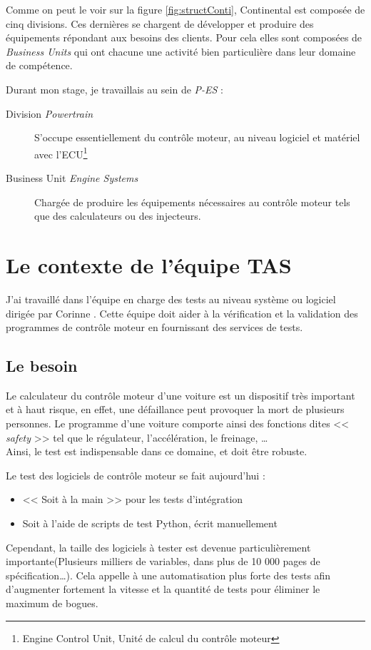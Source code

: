 		Comme on peut le voir sur la figure \ref{fig:structConti}, Continental est composée de cinq divisions. Ces dernières se chargent de développer et produire des équipements répondant aux besoins des clients. Pour cela elles sont composées de \textit{Business Units} qui ont chacune une activité bien particulière dans leur domaine de compétence. 

Durant mon stage, je travaillais au sein de \textit{P-ES} : 
\begin{description}
	\item[Division \textit{Powertrain}] S'occupe essentiellement du contrôle moteur, au niveau logiciel et matériel avec l'ECU\footnote{Engine Control Unit, Unité de calcul du contrôle moteur}
	\item[Business Unit \textit{Engine Systems}] Chargée de produire les équipements nécessaires au contrôle moteur tels que des calculateurs ou des injecteurs.
\end{description}

	\section{Le contexte de l'équipe TAS}
		J'ai travaillé dans l'équipe en charge des tests au niveau système ou logiciel dirigée par Corinne . Cette équipe doit aider à la vérification et la validation des programmes de contrôle moteur en fournissant des services de tests. 
		
 		\subsection{Le besoin} \label{besoinTests}
 		Le calculateur du contrôle moteur d'une voiture est un dispositif très important et à haut risque, en effet, une défaillance peut provoquer la mort de plusieurs personnes. Le programme d'une voiture comporte ainsi des fonctions dites << \textit{safety} >> tel que le régulateur, l'accélération, le freinage, \ldots\\
 		 Ainsi, le test est indispensable dans ce domaine, et doit être robuste. 

Le test des logiciels de contrôle moteur se fait aujourd'hui : 
\begin{itemize}
	\item << Soit à la main >> pour les tests d'intégration
	\item Soit à l'aide de scripts de test Python, écrit manuellement
\end{itemize}
Cependant, la taille des logiciels à tester est devenue particulièrement importante(Plusieurs milliers de variables, dans plus de 10 000 pages de spécification\ldots). Cela appelle à une automatisation plus forte des tests afin d'augmenter fortement la vitesse et la quantité de tests pour éliminer le maximum de bogues.

